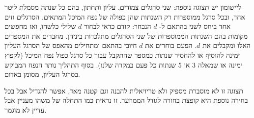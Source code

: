 ליישומון  יש תצוגה נוספת: שני סרגלים צמודים, עליון ותחתון, בהם כל שנתה מסמלת ליטר אחד, ובכל סרגל %
ממוספרות רק השנתות שהן כפולה של נפח המיכל המתאים. הסרגלים זזים אחד ביחס לשני בהתאם ל- %
$ d $ %
הנבחר: קודם כדאי לבחור %
$ d $ %
שלילי כלשהו, ואז מחפשים מקומות בהם השנתות הממוספרות של שני הסרגלים %
מתלכדות ביניהן. מחברים את המספרים האלו ומקבלים את  %
$ d $. %
הפעם בוחרים את %
$ d $ %
חיובי בהתאם ומתחילים מהאפס של הסרגל העליון ימינה להוסיף או להחסיר שנתות כמספר שהתקבל עבור כל סרגל כפול נפח %
המיכל (לקפוץ ימינה או שמאלה 3 או 5 שנתות כל פעם במקרה שלנו). בסוף התהליך נותר הנפח המבוקש %
בסרגל העליון, מסומן באדום.

תצוגה זו לא מוסברת מספיק ולא טריויאלית להבנה וגם קטנה מאד, אפשר להגדיל אבל בכל בחירה נוספת היא %
קופצת בחזרה לגודל הממוזער. זו נראית כמו התחלה של משהו מעניין אבל עדיין לא מוגמר.


